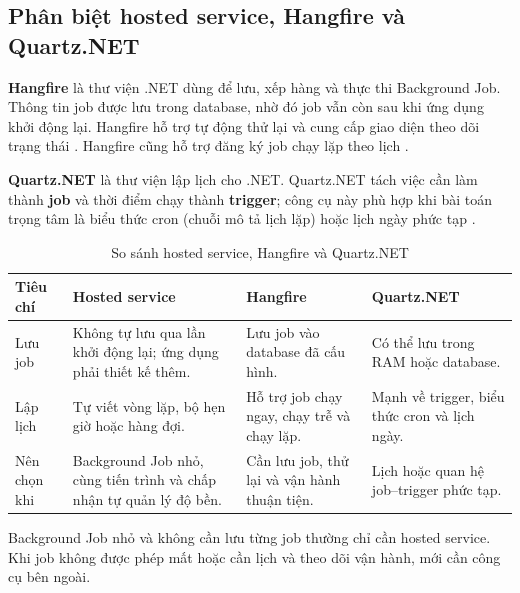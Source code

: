 \subsection{Phân biệt hosted service, Hangfire và Quartz.NET}

\textbf{Hangfire} là thư viện .NET dùng để lưu, xếp hàng và thực thi Background Job.
Thông tin job được lưu trong database, nhờ đó job vẫn còn sau khi ứng dụng khởi động
lại. Hangfire hỗ trợ tự động thử lại và cung cấp giao diện theo dõi trạng thái
\cite{hangfire-docs,hangfire-retry}. Hangfire cũng hỗ trợ đăng ký job chạy lặp theo
lịch \cite{hangfire-recurring}.

\textbf{Quartz.NET} là thư viện lập lịch cho .NET. Quartz.NET tách việc cần làm thành
\textbf{job} và thời điểm chạy thành
\textbf{trigger}; công cụ này phù hợp khi bài toán trọng tâm là biểu thức cron
(chuỗi mô tả lịch lặp) hoặc lịch ngày phức tạp
\cite{quartz-jobs-triggers,quartz-job-stores}.

{\scriptsize
\renewcommand{\arraystretch}{1.0}
\begin{longtable}{|>{\raggedright\arraybackslash}p{}|
                  >{\raggedright\arraybackslash}p{}|
                  >{\raggedright\arraybackslash}p{}|
                  >{\raggedright\arraybackslash}p{}|}
\caption{So sánh hosted service, Hangfire và Quartz.NET}\label{tab:job-tools}\\
\hline
\textbf{Tiêu chí} & \textbf{Hosted service} & \textbf{Hangfire} & \textbf{Quartz.NET} \\
\hline
Lưu job & Không tự lưu qua lần khởi động lại; ứng dụng phải thiết kế thêm. & Lưu job vào database đã cấu hình. & Có thể lưu trong RAM hoặc database. \\
\hline
Lập lịch & Tự viết vòng lặp, bộ hẹn giờ hoặc hàng đợi. & Hỗ trợ job chạy ngay, chạy trễ và chạy lặp. & Mạnh về trigger, biểu thức cron và lịch ngày. \\
\hline
Nên chọn khi & Background Job nhỏ, cùng tiến trình và chấp nhận tự quản lý độ bền. & Cần lưu job, thử lại và vận hành thuận tiện. & Lịch hoặc quan hệ job--trigger phức tạp. \\
\hline
\end{longtable}
}

Background Job nhỏ và không cần lưu từng job thường chỉ cần hosted service. Khi job không
được phép mất hoặc cần lịch và theo dõi vận hành, mới cần công cụ bên ngoài.
